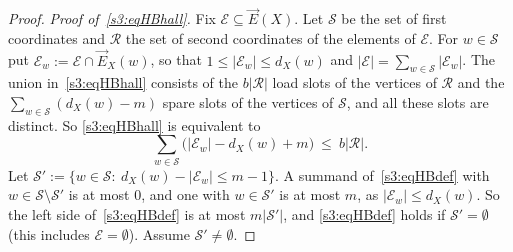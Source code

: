 \begin{proof}
\emph{Proof of~\eqref{s3:eqHBhall}.} Fix $\mathcal E\subseteq\vec E(X)$.
Let $\mathcal S$ be the set of first coordinates and $\mathcal R$ the set of
second coordinates of the elements of $\mathcal E$. For $w\in\mathcal S$ put
$\mathcal E_w:=\mathcal E\cap\vec E_X(w)$, so that
$1\le|\mathcal E_w|\le d_X(w)$ and
$|\mathcal E|=\sum_{w\in\mathcal S}|\mathcal E_w|$. The union
in~\eqref{s3:eqHBhall} consists of the $b|\mathcal R|$ load slots of the
vertices of $\mathcal R$ and the $\sum_{w\in\mathcal S}(d_X(w)-m)$ spare
slots of the vertices of $\mathcal S$, and all these slots are distinct.
So \eqref{s3:eqHBhall} is equivalent to
\begin{equation}\label{s3:eqHBdef}
\sum_{w\in\mathcal S}\bigl(|\mathcal E_w|-d_X(w)+m\bigr)\ \le\ b|\mathcal R| .
\end{equation}
Let $\mathcal S':=\{w\in\mathcal S:\ d_X(w)-|\mathcal E_w|\le m-1\}$. A
summand of~\eqref{s3:eqHBdef} with $w\in\mathcal S\setminus\mathcal S'$ is
at most $0$, and one with $w\in\mathcal S'$ is at most $m$, as
$|\mathcal E_w|\le d_X(w)$. So the left side of~\eqref{s3:eqHBdef} is at
most $m|\mathcal S'|$, and \eqref{s3:eqHBdef} holds if
$\mathcal S'=\emptyset$ (this includes $\mathcal E=\emptyset$). Assume
$\mathcal S'\ne\emptyset$.


\end{proof}
